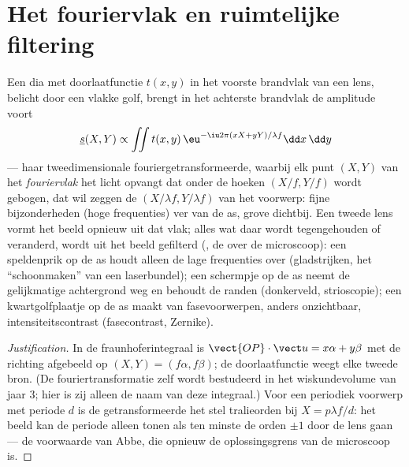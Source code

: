 \section{Het fouriervlak en ruimtelijke filtering}

\begin{proposition}\label{prop:b2:diffraction:fourier}
Een dia met doorlaatfunctie $t(x, y)$ in het voorste brandvlak van een
lens, belicht door een vlakke golf, brengt in het achterste brandvlak de
amplitude voort
\[
\underline s(X, Y) \propto \iint t(x, y)\,\eu^{-\iu2\pi(xX + yY)/\lambda f}\dd x\,\dd y
\]
--- haar tweedimensionale fouriergetransformeerde, waarbij elk punt $(X, Y)$ van het
\emph{fouriervlak} het licht opvangt dat onder de hoeken
$(X/f, Y/f)$ wordt gebogen, dat wil zeggen de \emph{}
$(X/\lambda f, Y/\lambda f)$ van
het voorwerp: fijne bijzonderheden (hoge frequenties) ver van de as, grove
dichtbij. Een tweede lens vormt het beeld opnieuw uit dat vlak; alles wat
daar wordt tegengehouden of veranderd, wordt uit het beeld gefilterd
(\emph{}, de  over de microscoop): een
speldenprik
op de as houdt alleen de lage frequenties over (gladstrijken, het
``schoonmaken'' van een
laserbundel); een schermpje op de as neemt de gelijkmatige achtergrond weg en
behoudt de randen (donkerveld, strioscopie); een kwartgolfplaatje op de
as maakt van fasevoorwerpen, anders onzichtbaar, intensiteitscontrast
(fasecontrast, Zernike).
\end{proposition}

\begin{proof}[Justification]
In de fraunhoferintegraal is $\vect{OP}\cdot\vect u = x\alpha + y\beta$ met de
richting afgebeeld op $(X, Y) = (f\alpha, f\beta)$; de doorlaatfunctie weegt
elke tweede bron. (De fouriertransformatie zelf wordt bestudeerd in het
wiskundevolume van jaar 3; hier is zij alleen de naam van deze integraal.)
Voor een periodiek voorwerp met periode $d$ is de getransformeerde het stel
tralieorden bij $X = p\lambda f/d$: het beeld kan de periode alleen tonen
als ten minste
de orden $\pm1$ door de lens gaan --- de voorwaarde van Abbe, die opnieuw
de oplossingsgrens van de microscoop is.
\end{proof}

